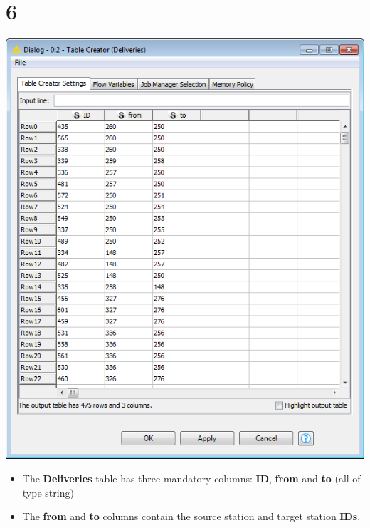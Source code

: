 \documentclass[10pt]{beamer}
\begin{document}
\section{6}
\begin{frame}
	\begin{center}
  		\includegraphics[height=0.6\textheight]{6.png}
	\end{center}
	\begin{itemize}
		\item The \textbf{Deliveries} table has three mandatory columns: \textbf{ID}, \textbf{from} and \textbf{to} (all of type string)
		\item The \textbf{from} and \textbf{to} columns contain the source station and target station \textbf{IDs}.
	\end{itemize}
\end{frame}
\end{document}
